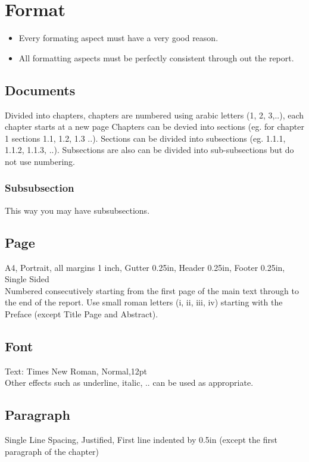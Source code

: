 \section{Format}
 
\begin{itemize}
 \item Every formating aspect must have a very good reason.
 \item All formatting aspects must be perfectly consistent through out the report. 
\end{itemize}


\subsection{Documents}
Divided into chapters, chapters are numbered using arabic letters (1, 2, 3,..), each chapter starts at a new page
Chapters can be devied into sections (eg. for chapter 1 sections 1.1, 1.2, 1.3 ..). Sections can be divided into subsections (eg. 1.1.1, 1.1.2, 1.1.3, ..). Subsections are also can be divided into sub-subsections but do not use numbering.

\subsubsection{Subsubsection}
This way you may have subsubsections.

\subsection{Page}
A4, Portrait, all margins 1 inch, Gutter 0.25in, Header 0.25in, Footer 0.25in, Single Sided\\
Numbered consecutively starting from the first page of the main text through to the end of the report. Use small roman letters (i, ii, iii, iv) starting with the Preface (except Title Page and Abstract).
 
\subsection{Font}
Text: Times New Roman, Normal,12pt\\
Other effects such as underline, italic, .. can be used as appropriate.

\subsection{Paragraph}
Single Line Spacing, Justified, First line indented by 0.5in (except the first paragraph of the chapter)

